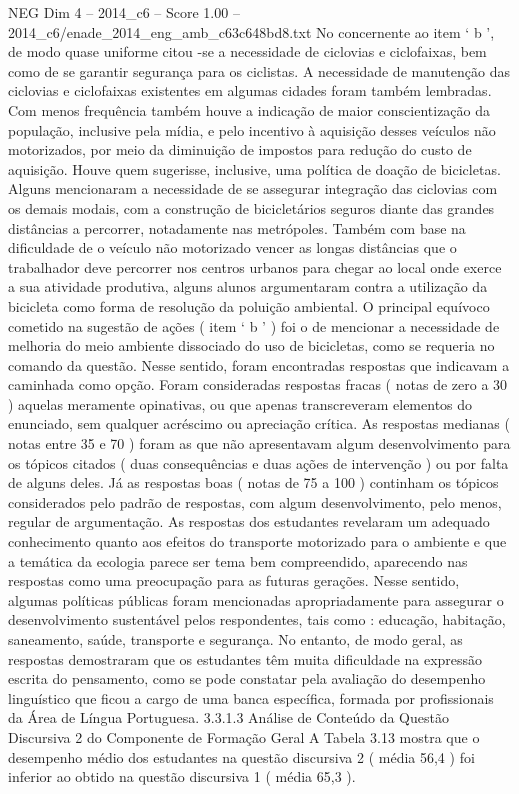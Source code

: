 \begin{textsample}{NEG Dim 4 – 2014\_c6 – Score 1.00 – 2014\_c6/enade\_2014\_eng\_amb\_c63c648bd8.txt}
No concernente ao item ‘ b ’, de modo quase uniforme citou -se a necessidade de ciclovias e ciclofaixas, bem como de se garantir segurança para os ciclistas.
A necessidade de manutenção das ciclovias e ciclofaixas existentes em algumas cidades foram também lembradas.
Com menos frequência também houve a indicação de maior conscientização da população, inclusive pela mídia, e pelo incentivo à aquisição desses veículos não motorizados, por meio da diminuição de impostos para redução do custo de aquisição.
Houve quem sugerisse, inclusive, uma política de doação de bicicletas.
Alguns mencionaram a necessidade de se assegurar integração das ciclovias com os demais modais, com a construção de bicicletários seguros diante das grandes distâncias a percorrer, notadamente nas metrópoles.
Também com base na dificuldade de o veículo não motorizado vencer as longas distâncias que o trabalhador deve percorrer nos centros urbanos para chegar ao local onde exerce a sua atividade produtiva, alguns alunos argumentaram contra a utilização da bicicleta como forma de resolução da poluição ambiental.
O principal equívoco cometido na sugestão de ações ( item ‘ b ’ ) foi o de mencionar a necessidade de melhoria do meio ambiente dissociado do uso de bicicletas, como se requeria no comando da questão.
Nesse sentido, foram encontradas respostas que indicavam a caminhada como opção.
Foram consideradas respostas fracas ( notas de zero a 30 ) aquelas meramente opinativas, ou que apenas transcreveram elementos do enunciado, sem qualquer acréscimo ou apreciação crítica.
As respostas medianas ( notas entre 35 e 70 ) foram as que não apresentavam algum desenvolvimento para os tópicos citados ( duas consequências e duas ações de intervenção ) ou por falta de alguns deles.
Já as respostas boas ( notas de 75 a 100 ) continham os tópicos considerados pelo padrão de respostas, com algum desenvolvimento, pelo menos, regular de argumentação.
As respostas dos estudantes revelaram um adequado conhecimento quanto aos efeitos do transporte motorizado para o ambiente e que a temática da ecologia parece ser tema bem compreendido, aparecendo nas respostas como uma preocupação para as futuras gerações.
Nesse sentido, algumas políticas públicas foram mencionadas apropriadamente para assegurar o desenvolvimento sustentável pelos respondentes, tais como : educação, habitação, saneamento, saúde, transporte e segurança.
No entanto, de modo geral, as respostas demostraram que os estudantes têm muita dificuldade na expressão escrita do pensamento, como se pode constatar pela avaliação do desempenho linguístico que ficou a cargo de uma banca específica, formada por profissionais da Área de Língua Portuguesa. 3.3.1.3 Análise de Conteúdo da Questão Discursiva 2 do Componente de Formação Geral A Tabela 3.13 mostra que o desempenho médio dos estudantes na questão discursiva 2 ( média 56,4 ) foi inferior ao obtido na questão discursiva 1 ( média 65,3 ).

\end{textsample}
